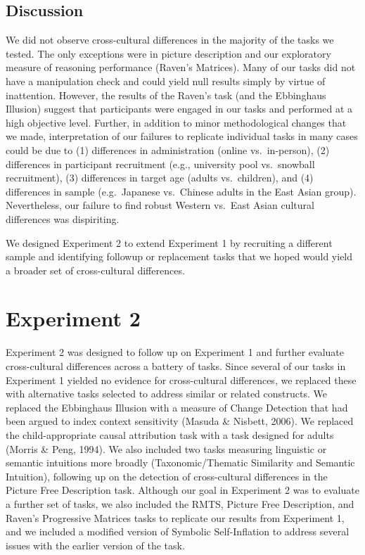 \documentclass[
  man]{apa6}
\begin{document}
\hypertarget{discussion}{%
\subsection{Discussion}\label{discussion}}

We did not observe cross-cultural differences in the majority of the tasks we tested. The only exceptions were in picture description and our exploratory measure of reasoning performance (Raven's Matrices). Many of our tasks did not have a manipulation check and could yield null results simply by virtue of inattention. However, the results of the Raven's task (and the Ebbinghaus Illusion) suggest that participants were engaged in our tasks and performed at a high objective level. Further, in addition to minor methodological changes that we made, interpretation of our failures to replicate individual tasks in many cases could be due to (1) differences in administration (online vs.~in-person), (2) differences in participant recruitment (e.g., university pool vs.~snowball recruitment), (3) differences in target age (adults vs.~children), and (4) differences in sample (e.g.~Japanese vs.~Chinese adults in the East Asian group). Nevertheless, our failure to find robust Western vs.~East Asian cultural differences was dispiriting.

We designed Experiment 2 to extend Experiment 1 by recruiting a different sample and identifying followup or replacement tasks that we hoped would yield a broader set of cross-cultural differences.

\hypertarget{experiment-2}{%
\section{Experiment 2}\label{experiment-2}}

Experiment 2 was designed to follow up on Experiment 1 and further evaluate cross-cultural differences across a battery of tasks. Since several of our tasks in Experiment 1 yielded no evidence for cross-cultural differences, we replaced these with alternative tasks selected to address similar or related constructs. We replaced the Ebbinghaus Illusion with a measure of Change Detection that had been argued to index context sensitivity (Masuda \& Nisbett, 2006). We replaced the child-appropriate causal attribution task with a task designed for adults (Morris \& Peng, 1994). We also included two tasks measuring linguistic or semantic intuitions more broadly (Taxonomic/Thematic Similarity and Semantic Intuition), following up on the detection of cross-cultural differences in the Picture Free Description task. Although our goal in Experiment 2 was to evaluate a further set of tasks, we also included the RMTS, Picture Free Description, and Raven's Progressive Matrices tasks to replicate our results from Experiment 1, and we included a modified version of Symbolic Self-Inflation to address several issues with the earlier version of the task.
\end{document}
